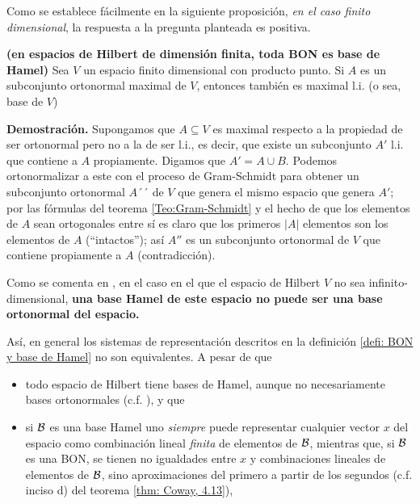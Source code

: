 Como se establece 
fácilmente en la siguiente proposición,
\textit{en el caso finito dimensional}, la respuesta a la pregunta
planteada es positiva.

\begin{prop}
\textbf{(en espacios de Hilbert de dimensión finita, toda BON es
base de Hamel)}
\label{prop: en dimension finita toda BON es base de Hamel}
Sea $V$ un espacio finito dimensional
con producto punto. Si $A$
es un subconjunto ortonormal maximal de $V$, entonces
también es maximal l.i. (o sea, base de $V$)
\end{prop}
\noindent
\textbf{Demostración.}
Supongamos que $A \subseteq V$ es maximal 
respecto a la propiedad de ser ortonormal pero
no a la de ser l.i., es decir, que existe
un subconjunto $A'$ l.i. que contiene a $A$ propiamente.
Digamos que $A' = A \cup B$.
Podemos ortonormalizar a este con el proceso de Gram-Schmidt
para obtener un subconjunto ortonormal $A´´$ de
$V$ que genera 
el mismo espacio que genera $A'$;
por las fórmulas del teorema \ref{Teo:Gram-Schmidt}
y el hecho de que los elementos de $A$ sean ortogonales
entre sí es claro que los primeros $|A|$ elementos
son los elementos de $A$ (``intactos''); así $A''$
es un subconjunto ortonormal de $V$ que contiene propiamente
a $A$ (contradicción).
\QEDB
\vspace{0.2cm}


Como se comenta en \cite{mse1},
en el caso en el que el espacio de Hilbert $V$
no sea infinito-dimensional, \textbf{una base 
Hamel de este espacio no puede ser una
base ortonormal del espacio.}

Así, en general los sistemas de representación
descritos en la definición 
\ref{defi: BON y base de Hamel} no son equivalentes.
A pesar de que
\begin{itemize}
	\item todo espacio de Hilbert tiene bases de Hamel, aunque
	no necesariamente bases ortonormales (c.f. 
	\cite{mse2}), y que
	
	\item si $\mathcal{B}$ es una base Hamel uno \textit{siempre}
	puede representar cualquier vector $x$ del espacio como combinación
	lineal \textit{finita} de elementos de $\mathcal{B}$, mientras que,
	si $\mathcal{B}$ es una BON, se tienen no igualdades entre 
	$x$ y combinaciones lineales de elementos de $\mathcal{B}$, sino aproximaciones
	del primero a partir de los segundos (c.f. inciso d)
	del teorema \ref{thm: Coway, 4.13}),
\end{itemize}

